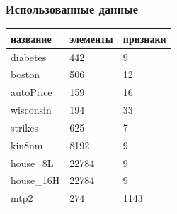 \documentclass{beamer}
\begin{document}
\begin{frame}
    \frametitle{Использованные данные}
    \begin{center}
        \begin{tabular}{|l|l|l|}

        \hline
         
        название        & элементы  & признаки \\

        \hline

        diabetes        & 442    & 9     \\
        boston          & 506    & 12    \\
        autoPrice       & 159    & 16    \\
        wisconsin       & 194    & 33    \\
        strikes         & 625    & 7     \\
        kin8nm          & 8192   & 9     \\
        house\_8L       & 22784  & 9     \\
        house\_16H      & 22784  & 9     \\
        mtp2            & 274    & 1143  \\

        \hline

    \end{tabular}
    \end{center}
\end{frame}




\end{document}
